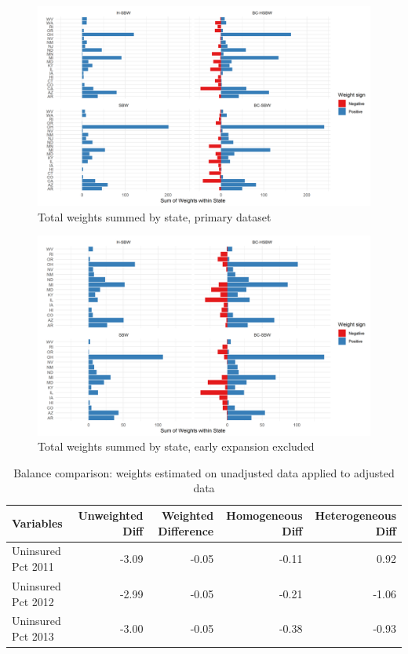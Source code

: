 \begin{figure}[H]
\begin{center}
    \caption{Total weights summed by state, primary dataset}
    \label{fig:weightsbystatec1all}
    \includegraphics[scale=0.5]{01_Plots/weights-by-state-c1-all.png}
\end{center}
\end{figure}

\begin{figure}[H]
\begin{center}
    \caption{Total weights summed by state, early expansion excluded}
    \label{fig:weightsbystatec2all}
    \includegraphics[scale=0.5]{01_Plots/weights-by-state-c2-all.png}
\end{center}
\end{figure}


\begin{table}[ht]
\caption{Balance comparison: weights estimated on unadjusted data applied to adjusted data}\label{tab:balcomp}
\begin{tabular}{lrrrr}
  \hline
Variables & Unweighted Diff & Weighted Difference & Homogeneous Diff & Heterogeneous Diff\\ 
  \hline
Uninsured Pct 2011 & -3.09 & -0.05 & -0.11 & 0.92 \\ 
  Uninsured Pct 2012 & -2.99 & -0.05 & -0.21 & -1.06 \\ 
  Uninsured Pct 2013 & -3.00 & -0.05 & -0.38 & -0.93 \\
  \hline
\end{tabular}
\end{table}
\clearpage